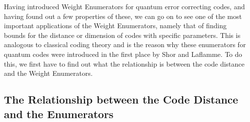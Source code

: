 \documentclass[12pt,a4paper,BCOR15mm,twoside,DIV12]{article}
\theoremstyle{definition}
\begin{document}
Having introduced Weight Enumerators for quantum error correcting codes, and having found out a few properties of these, we can go on to see one of the most important applications of the Weight Enumerators, namely that of finding bounds for the distance or dimension of codes with specific parameters.
This is analogous to classical coding theory and is the reason why these enumerators for quantum codes were introduced in the first place by Shor and Laflamme. To do this, we first have to find out what the relationship is between the code distance and the Weight Enumerators.


\subsection{The Relationship between the Code Distance and the Enumerators}
\end{document}
